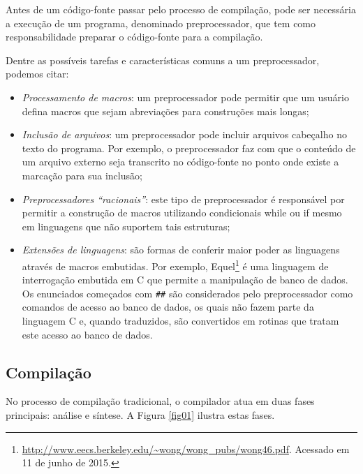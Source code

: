 Antes de um código-fonte passar pelo processo de compilação, pode ser
 necessária a execução de um programa, denominado preprocessador, que
 tem como responsabilidade preparar o código-fonte para a compilação. 

Dentre as possíveis tarefas e características comuns a um preprocessador,
 podemos citar:

\begin{itemize}

\item \textit{Processamento de macros}: um preprocessador pode permitir que um usuário 
    defina macros que sejam abreviações para construções mais longas\cite[pag.8]{ref3};

\item \textit{Inclusão de arquivos}: um preprocessador pode incluir arquivos cabeçalho no
     texto do programa. Por exemplo, o preprocessador faz com que o conteúdo de
     um arquivo externo seja transcrito no código-fonte no ponto onde existe a 
    marcação para sua inclusão\cite[pag.8]{ref2};

\item \textit{Preprocessadores “racionais”}: este tipo de preprocessador é responsável 
    por permitir a construção de macros utilizando condicionais while ou if mesmo
     em linguagens que não suportem tais estruturas\cite[pag.8]{ref2};

\item \textit{Extensões de linguagens}: são formas de conferir maior poder as linguagens
     através de macros embutidas. Por exemplo, 
    Equel\footnote{\url{http://www.eecs.berkeley.edu/~wong/wong\_pubs/wong46.pdf}. Acessado em 11 de junho de 2015.} é uma linguagem de 
    interrogação embutida em C que permite a manipulação de banco de dados. 
    Os enunciados começados com \texttt{\#\#} são considerados pelo preprocessador como
     comandos de acesso ao banco de dados, os quais não fazem parte da 
    linguagem C e, quando traduzidos, são convertidos em rotinas que tratam 
    este acesso ao banco de dados\cite[pag.8]{ref3}.

\end{itemize}

\subsection{Compilação}

No processo de compilação tradicional, o compilador atua em duas fases 
principais: análise e síntese\cite[pag.26]{ref6}. A Figura \ref{fig01}
 ilustra estas fases. 

